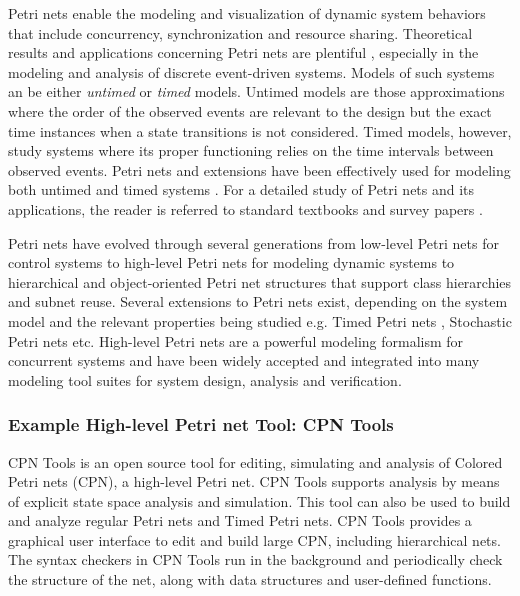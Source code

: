 Petri nets enable the modeling and visualization of dynamic system behaviors that include concurrency, synchronization and resource sharing. Theoretical results and applications concerning Petri nets are plentiful \cite{david1994petri, holloway1997survey}, especially in the modeling and analysis of discrete event-driven systems. Models of such systems an be either \emph{untimed} or \emph{timed} models. Untimed models are those approximations where the order of the observed events are relevant to the design but the exact time instances when a state transitions is not considered. Timed models, however, study systems where its proper functioning relies on the time intervals between observed events. Petri nets and extensions have been effectively used for modeling both untimed \cite{holloway1997survey} and timed systems \cite{zuberek1991timed}. For a detailed study of Petri nets and its applications, the reader is referred to standard textbooks \cite{peterson1977petri, reisig2012petri} and survey papers \cite{murata1989petri, zhou1999modeling, zurawski1994petri}.

Petri nets have evolved through several generations from low-level Petri nets for control systems \cite{reisig2012petri} to high-level Petri nets for modeling dynamic systems \cite{jensen2012high} to hierarchical and object-oriented Petri net structures \cite{de2001object} that support class hierarchies and subnet reuse. Several extensions to Petri nets exist, depending on the system model and the relevant properties being studied e.g. Timed Petri nets \cite{wang2012timed}, Stochastic Petri nets \cite{bause1996stochastic, marsan1994modelling} etc. High-level Petri nets are a powerful modeling formalism for concurrent systems and have been widely accepted and integrated into many modeling tool suites for system design, analysis and verification. 

\subsubsection{Example High-level Petri net Tool: CPN Tools}

CPN Tools \cite{CPNTools} is an open source tool for editing, simulating and analysis of Colored Petri nets (CPN), a high-level Petri net. CPN Tools supports analysis by means of explicit state space analysis and simulation. This tool can also be used to build and analyze regular Petri nets and Timed Petri nets. CPN Tools provides a graphical user interface to edit and build large CPN, including hierarchical nets. The syntax checkers in CPN Tools run in the background and periodically check the structure of the net, along with data structures and user-defined functions. 

